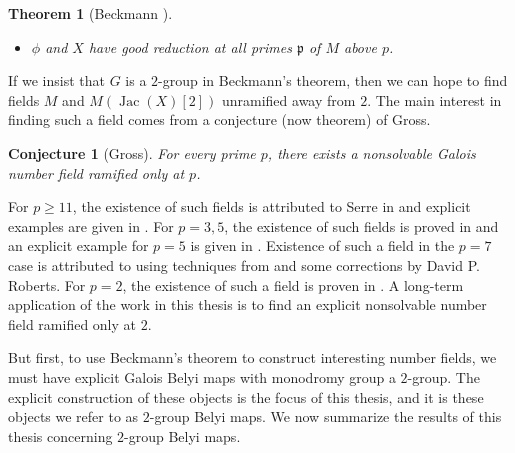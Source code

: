 \documentclass{dcthesis}
\newcommand{\defi}[1]{\textsf{#1}}
\DeclareMathOperator{\Jac}{Jac}
\numberwithin{equation}{section}
\newtheorem{theorem}[equation]{Theorem}
\newtheorem{conj}[equation]{Conjecture}
\theoremstyle{definition}
\theoremstyle{remark}
\begin{document}
{{{\begin{theorem}[Beckmann \cite{beckmann}]
\begin{itemize}
          the Belyi map $\phi$ is defined over $M$; and
        \item
          $\phi$ and $X$ have good reduction at all primes $\mathfrak{p}$
          of $M$ above $p$.
      \end{itemize}
    \end{theorem}
    If we insist that $G$ is a $2$-group
    in Beckmann's theorem,
    then we can hope to find
    fields $M$
    and $M(\Jac(X)[2])$ unramified away from $2$.
    The main interest in finding such a field
    comes from a conjecture
    (now theorem) of Gross.
    \begin{conj}[Gross]
      \label{conj:gross}
      For every prime $p$,
      there exists a nonsolvable Galois
      number field
      ramified only at $p$.
    \end{conj}
    For $p\geq 11$, the existence of such
    fields is attributed to Serre in
    \cite{serre32,serre33}
    and explicit examples are given
    in \cite{mascot}.
    For $p=3,5$, the existence of such fields
    is proved in \cite{DGV}
    and an explicit example for $p=5$
    is given in \cite{roberts5}.
    Existence of such a field in the $p=7$ case
    is attributed to
    \cite{die} using techniques from
    \cite{DGV} and some corrections by
    David P. Roberts.
    For $p=2$, the existence of such a field
    is proven in \cite{lassina}.
    A long-term application of the work
    in this thesis is to
    find an explicit nonsolvable number field
    ramified only at $2$.
    \par
    But first, to use Beckmann's theorem
    to construct interesting number fields,
    we must have explicit
    Galois Belyi maps with monodromy group
    a $2$-group.
    The explicit construction of these
    objects is the focus of this thesis,
    and it is these objects we refer to as
    \defi{$2$-group Belyi maps}.
    We now summarize the results of this thesis
    concerning
    $2$-group Belyi maps.
  }
}}
\end{document}
